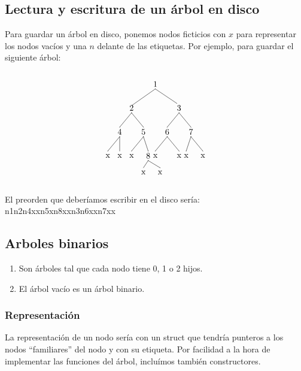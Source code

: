 \documentclass[10pt,a4paper,spanish]{report}
\begin{document}
\subsection{\textcolor[rgb]{0.3,0.4,0.8}Lectura y escritura de un árbol en disco}
\noindent
Para guardar un árbol en disco, ponemos nodos ficticios con $x$ para representar los nodos vacíos y una $n$ delante de las etiquetas. Por ejemplo, para guardar el siguiente árbol: \label{arbol_disco}

\[\begin{xy}
,(0,0)*+=<10mm>[]\txt<2cm>{1}
,(-10,-10)*+=<10mm>[]\txt<2cm>{2}
,(10,-10)*+=<10mm>[]\txt<2cm>{3}
,(-15,-20)*+=<10mm>[]\txt<2cm>{4}
,(-5,-20)*+=<10mm>[]\txt<2cm>{5}
,(5,-20)*+=<10mm>[]\txt<2cm>{6}
,(15,-20)*+=<10mm>[]\txt<2cm>{7}
,(0,-30)*+=<10mm>[]\txt<2cm>{x}
,(10,-30)*+=<10mm>[]\txt<2cm>{x}
,(-20,-30)*+=<10mm>[]\txt<2cm>{x}
,(-15,-30)*+=<10mm>[]\txt<2cm>{x}
,(20,-30)*+=<10mm>[]\txt<2cm>{x}
,(-10,-30)*+=<10mm>[]\txt<2cm>{x}
,(-3,-30)*+=<10mm>[]\txt<2cm>{8}
,(13,-30)*+=<10mm>[]\txt<2cm>{x}
,(2,-37)*+=<10mm>[]\txt<2cm>{x}
,(-5,-37)*+=<10mm>[]\txt<2cm>{x}

\ar@{-} (0,-2);(-10,-9)
\ar@{-} (0,-2);(9,-8)
\ar@{-} (-10,-12);(-15,-18)
\ar@{-} (10,-12);(5,-18)
\ar@{-} (10,-12);(15,-18)
\ar@{-} (5,-22);(0,-28)
\ar@{-} (5,-22);(10,-28)
\ar@{-} (-15,-22);(-20,-28)
\ar@{-} (-15,-22);(-15,-28)
\ar@{-} (15,-22);(20,-28)
\ar@{-} (-10,-12);(-5,-18)
\ar@{-} (-5,-22);(-10,-28)
\ar@{-} (-5,-22);(-3,-28)
\ar@{-} (15,-22);(13,-28)
\ar@{-} (-3,-32);(2,-35)
\ar@{-} (-3,-32);(-5,-35)
\end{xy}\]

\noindent
El preorden que deberíamos escribir en el disco sería: n1n2n4xxn5xn8xxn3n6xxn7xx

\subsection{\textcolor[rgb]{0.3,0.4,0.8}Arboles binarios}
\begin{enumerate}[$\longrightarrow$]
\item Son árboles tal que cada nodo tiene 0, 1 o 2 hijos.
\item El árbol vacío es un árbol binario.
\end{enumerate}

\subsubsection{\textcolor[rgb]{0.3,0.4,0.8}Representación}
\noindent
La representación de un nodo sería con un struct que tendría punteros a los nodos ``familiares'' del nodo y con su etiqueta. Por facilidad a la hora de implementar las funciones del árbol, incluímos también constructores.
\end{document}
